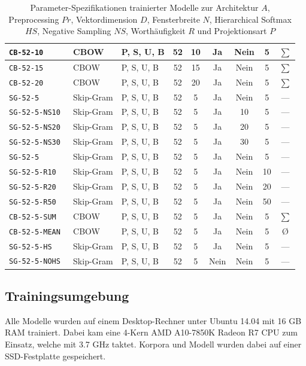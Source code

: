 \begin{table}[!ht]
\begin{tabular}{|l|l|l|c|c|c|c|c|c|}
\tt{CB-52-10}     & CBOW      & P, S, U, B & 52  & 10 & Ja   & Nein & 5  & $\sum$ \\ \hline
\tt{CB-52-15}     & CBOW      & P, S, U, B & 52  & 15 & Ja   & Nein & 5  & $\sum$ \\ \hline
\tt{CB-52-20}     & CBOW      & P, S, U, B & 52  & 20 & Ja   & Nein & 5  & $\sum$ \\ \hline\hline
\tt{SG-52-5}      & Skip-Gram & P, S, U, B & 52  & 5  & Ja   & Nein & 5  & ---    \\ \hline
\tt{SG-52-5-NS10} & Skip-Gram & P, S, U, B & 52  & 5  & Ja   & 10   & 5  & ---    \\ \hline
\tt{SG-52-5-NS20} & Skip-Gram & P, S, U, B & 52  & 5  & Ja   & 20   & 5  & ---    \\ \hline
\tt{SG-52-5-NS30} & Skip-Gram & P, S, U, B & 52  & 5  & Ja   & 30   & 5  & ---    \\ \hline\hline
\tt{SG-52-5}      & Skip-Gram & P, S, U, B & 52  & 5  & Ja   & Nein & 5  & ---    \\ \hline
\tt{SG-52-5-R10}  & Skip-Gram & P, S, U, B & 52  & 5  & Ja   & Nein & 10 & ---    \\ \hline
\tt{SG-52-5-R20}  & Skip-Gram & P, S, U, B & 52  & 5  & Ja   & Nein & 20 & ---    \\ \hline
\tt{SG-52-5-R50}  & Skip-Gram & P, S, U, B & 52  & 5  & Ja   & Nein & 50 & ---    \\ \hline\hline
\tt{CB-52-5-SUM}  & CBOW      & P, S, U, B & 52  & 5  & Ja   & Nein & 5  & $\sum$ \\ \hline
\tt{CB-52-5-MEAN} & CBOW      & P, S, U, B & 52  & 5  & Ja   & Nein & 5  & \O     \\ \hline
\tt{SG-52-5-HS}   & Skip-Gram & P, S, U, B & 52  & 5  & Ja   & Nein & 5  & ---    \\ \hline
\tt{SG-52-5-NOHS} & Skip-Gram & P, S, U, B & 52  & 5  & Nein & Nein & 5  & ---    \\ \hline
\end{tabular}
\caption[Parameter-Spezifikationen trainierter Modelle]{\label{tab.parameter}Parameter-Spezifikationen trainierter Modelle zur Architektur $A$, Preprocessing $Pr$, Vektordimension $D$, Fensterbreite $N$, Hierarchical Softmax $HS$, Negative Sampling $NS$, Worthäufigkeit $R$ und Projektionsart $P$}
\vspace{1ex}\end{table}


\subsection{Trainingsumgebung}\label{ss.trainingsumgebung}
Alle Modelle wurden auf einem Desktop-Rechner unter Ubuntu 14.04 mit 16 GB RAM trainiert. Dabei kam eine 4-Kern AMD A10-7850K Radeon R7 CPU zum Einsatz, welche mit 3.7 GHz taktet. Korpora und Modell wurden dabei auf einer SSD-Festplatte gespeichert. %

